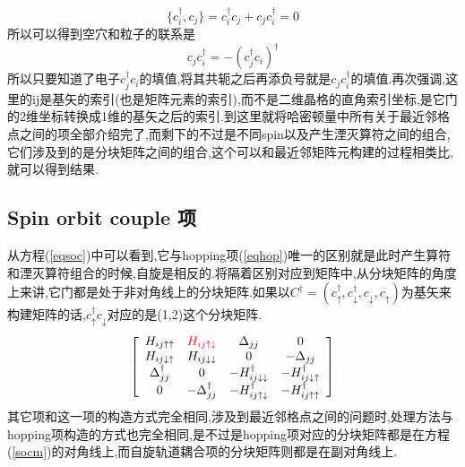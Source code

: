 \documentclass[a4paper,12pt]{ctexart}
\numberwithin{equation}{section}
\begin{document}
\begin{equation}
\{c^\dagger_i,c_j\}=c^\dagger_ic_j+c_jc^\dagger_i=0
\end{equation}
所以可以得到空穴和粒子的联系是
\begin{equation}
c_jc^\dagger_i=-(c_j^\dagger c_i)^\dagger
\end{equation}
所以只要知道了电子$c_j^\dagger c_i$的填值,将其共轭之后再添负号就是$c_jc_i^\dagger$的填值.再次强调,这里的ij是基矢的索引(也是矩阵元素的索引),而不是二维晶格的直角索引坐标,是它门的2维坐标转换成1维的基矢之后的索引.到这里就将哈密顿量中所有关于最近邻格点之间的项全部介绍完了,而剩下的不过是不同spin以及产生湮灭算符之间的组合,它们涉及到的是分块矩阵之间的组合,这个可以和最近邻矩阵元构建的过程相类比,就可以得到结果.
\subsection{Spin orbit couple 项}
从方程(\ref{eqsoc})中可以看到,它与hopping项(\ref{eqhop})唯一的区别就是此时产生算符和湮灭算符组合的时候,自旋是相反的.将隔着区别对应到矩阵中,从分块矩阵的角度上来讲,它门都是处于非对角线上的分块矩阵.如果以$C^\dagger=(c^\dagger_\uparrow,c^\dagger_\downarrow,c_\downarrow,c_\uparrow)$为基矢来构建矩阵的话,$c^\dagger_\uparrow c_\downarrow$对应的是(1,2)这个分块矩阵.
\begin{equation}
\left[
\begin{array}{cccc}
H_{ij\uparrow\uparrow}&\textcolor{red}{H_{ij\uparrow\downarrow}}&\Delta_{jj}&0\\
H_{ij\downarrow\uparrow}&H_{ij\downarrow\downarrow}&0&-\Delta_{jj}\\
\Delta_{jj}^\dagger&0&-H_{ij\downarrow\downarrow}^\dagger&-H_{ij\downarrow\uparrow}^\dagger\\
0&-\Delta_{jj}^\dagger&-H_{ij\uparrow\downarrow}^\dagger&-H_{ij\uparrow\uparrow}^\dagger
\end{array}
\right]\label{socm}
\end{equation}
其它项和这一项的构造方式完全相同,涉及到最近邻格点之间的问题时,处理方法与hopping项构造的方式也完全相同,是不过是hopping项对应的分块矩阵都是在方程(\ref{socm})的对角线上,而自旋轨道耦合项的分块矩阵则都是在副对角线上.
\end{document}
